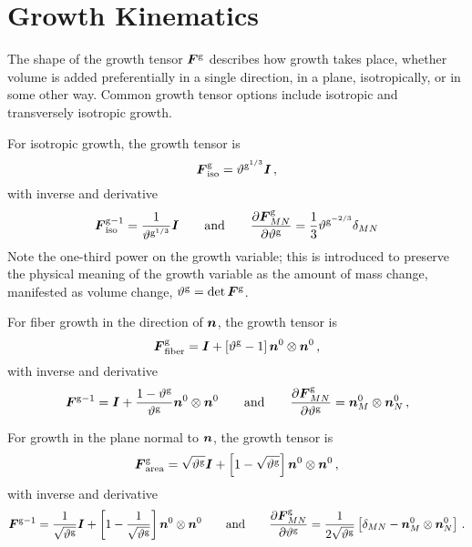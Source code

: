 \documentclass[10pt,letterpaper,oneside]{report}
\newcommand{\ten}[1]{\mbox{\boldmath $#1$}{}}
\newcommand{\scas}[1]{\mbox{{\scriptsize{${\rm{#1}}$}}}{}}
\begin{document}
\section{Growth Kinematics}
\label{kinematics}
The shape of the growth tensor $\ten{F}^{\scas{g}}$ describes how growth takes place, whether volume is added preferentially in a single direction, in a plane, isotropically, or in some other way. Common growth tensor options include isotropic and transversely isotropic growth.  

For isotropic growth, the growth tensor is
\begin{equation}
\ten{F}^{\scas{g}}_{\scas{iso}} = \vartheta^{\scas{g}^{1/3}} \ten{I} \, , 
\label{Fg_iso}
\end{equation}
with inverse and derivative
\begin{equation}
\ten{F}^{\scas{g}-1}_{\scas{iso}} = \frac{1}{\vartheta^{\scas{g}^{1/3}}} \ten{I}
\qquad \mbox{and} \qquad
\frac{\partial \ten{F}^{\scas{g}}_{MN} }{\partial \vartheta^{\scas{g}}} = \frac{1}{3} \vartheta^{\scas{g}^{-2/3}} \delta_{MN}
\label{Fg_iso2}
\end{equation}
Note the one-third power on the growth variable; this is introduced to preserve the physical meaning of the growth variable as the amount of mass change, manifested as volume change, $\vartheta^{\scas{g}} = \det \ten{F}^{\scas{g}}$.

For fiber growth in the direction of $\ten{n}$, the growth tensor is
\begin{equation}
\ten{F}^{\scas{g}}_{\scas{fiber}} = \ten{I} + \left[ \vartheta^{\scas{g}} - 1 \right] \ten{n}^0 \otimes \ten{n}^0 \, , 
\label{Fg_fiber} 
\end{equation}
with inverse and derivative 
\begin{equation}
\ten{F}^{\scas{g}-1} = \ten{I} + \frac{1 - \vartheta^{\scas{g}}}{\vartheta^{\scas{g}}} \ten{n}^0 \otimes \ten{n}^0  
\qquad \mbox{and} \qquad
\frac{\partial \ten{F}^{\scas{g}}_{MN} }{\partial \vartheta^{\scas{g}}} = \ten{n}^0_M \otimes \ten{n}^0_N  \, , 
\label{Fg_fiber2} 
\end{equation}

For growth in the plane normal to $\ten{n}$, the growth tensor is
\begin{equation}
\ten{F}^{\scas{g}}_{\scas{area}} = \sqrt{\vartheta^{\scas{g}}} \ten{I} + \left[ 1 - \sqrt{\vartheta^{\scas{g}}} \right] \ten{n}^0 \otimes \ten{n}^0 \, , 
\label{Fg_planar}
\end{equation}
with inverse and derivative
\begin{equation}
\ten{F}^{\scas{g}-1} = \frac{1}{\sqrt{\vartheta^{\scas{g}}}} \ten{I} + \left[1-\frac{1}{\sqrt{\vartheta^{\scas{g}}}} \right] \ten{n}^0 \otimes \ten{n}^0  
\qquad \mbox{and} \qquad
\frac{\partial \ten{F}^{\scas{g}}_{MN} }{\partial \vartheta^{\scas{g}}} = \frac{1}{2\sqrt{\vartheta^{\scas{g}}}} \left[ \delta_{MN} - \ten{n}^0_M \otimes \ten{n}^0_N \right] \, .
\label{Fg_planar2}
\end{equation}
\end{document}
